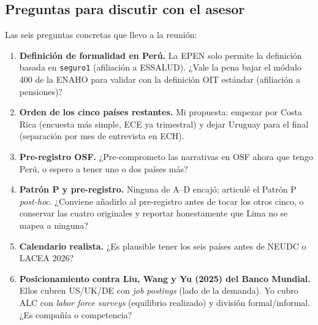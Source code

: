 \documentclass[12pt]{article}
\begin{document}
\subsection{Preguntas para discutir con el asesor}

Las seis preguntas concretas que llevo a la reunión:

\begin{enumerate}
  \item \textbf{Definición de formalidad en Perú.} La EPEN solo permite la definición basada en \texttt{seguro1} (afiliación a ESSALUD). ¿Vale la pena bajar el módulo 400 de la ENAHO para validar con la definición OIT estándar (afiliación a pensiones)?
  \item \textbf{Orden de los cinco países restantes.} Mi propuesta: empezar por Costa Rica (encuesta más simple, ECE ya trimestral) y dejar Uruguay para el final (separación por mes de entrevista en ECH).
  \item \textbf{Pre-registro OSF.} ¿Pre-comprometo las narrativas en OSF ahora que tengo Perú, o espero a tener uno o dos países más?
  \item \textbf{Patrón P y pre-registro.} Ninguna de A--D encajó; articulé el Patrón P \emph{post-hoc}. ¿Conviene añadirlo al pre-registro antes de tocar los otros cinco, o conservar las cuatro originales y reportar honestamente que Lima no se mapea a ninguna?
  \item \textbf{Calendario realista.} ¿Es plausible tener los seis países antes de NEUDC o LACEA 2026?
  \item \textbf{Posicionamiento contra Liu, Wang y Yu (2025) del Banco Mundial.} Ellos cubren US/UK/DE con \emph{job postings} (lado de la demanda). Yo cubro ALC con \emph{labor force surveys} (equilibrio realizado) y división formal/informal. ¿Es compañía o competencia?
\end{enumerate}

\vfill
\end{document}
